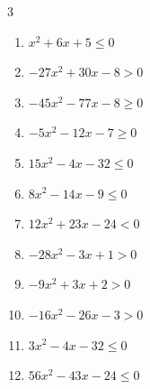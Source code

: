 \begin{multicols}{3}
\begin{enumerate}

  \item $x^{2}+6x+5\leq 0$

        \phantom{$\displaystyle -5 \leqq x \leqq -1$}

  \item $-27x^{2}+30x-8>0$


  \item $-45x^{2}-77x-8\geq 0$


  \item $-5x^{2}-12x-7\geq 0$


  \item $15x^{2}-4x-32\leq 0$


  \item $8x^{2}-14x-9\leq 0$


  \item $12x^{2}+23x-24<0$


  \item $-28x^{2}-3x+1>0$


\columnbreak %

  \item $-9x^{2}+3x+2>0$


  \item $-16x^{2}-26x-3>0$


  \item $3x^{2}-4x-32\leq 0$


  \item $56x^{2}-43x-24\leq 0$


\end{enumerate}
\end{multicols}
